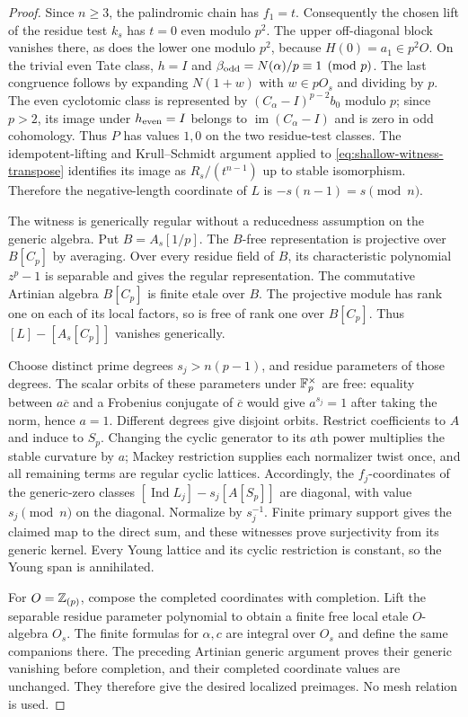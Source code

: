 \begin{proof}
Since $n\ge3$, the palindromic chain has $f_1=t$.
Consequently the chosen lift of the residue test $k_s$ has
$t=0$ even modulo $p^2$.
The upper off-diagonal block vanishes there, as does the
lower one modulo $p^2$, because $H(0)=a_1\in p^2O$.
On the trivial even Tate class, $h=I$ and
$\beta_{\rm odd}=N(\alpha)/p\equiv1\pmod p$.
The last congruence follows by expanding $N(1+w)$ with
$w\in pO_s$ and dividing by $p$.
The even cyclotomic class is represented by
$(C_\alpha-I)^{p-2}b_0$ modulo $p$; since $p>2$, its image
under $h_{\rm even}=I$ belongs to
$\operatorname{im}(C_\alpha-I)$ and is zero in odd cohomology.
Thus $P$ has values $1,0$ on the two residue-test classes.
The idempotent-lifting and Krull--Schmidt argument applied
to \eqref{eq:shallow-witness-transpose} identifies its image
as $R_s/(t^{n-1})$ up to stable isomorphism.
Therefore the negative-length coordinate of $L$ is
$-s(n-1)=s\pmod n$.

The witness is generically regular without a reducedness
assumption on the generic algebra.  Put $B=A_s[1/p]$.
The $B$-free representation is projective over $B[C_p]$
by averaging.  Over every residue field of $B$, its
characteristic polynomial $z^p-1$ is separable and gives
the regular representation.
The commutative Artinian algebra $B[C_p]$ is finite etale
over $B$.  The projective module has rank one on each
of its local factors, so is free of rank one over $B[C_p]$.
Thus $[L]-[A_s[C_p]]$ vanishes generically.

Choose distinct prime degrees $s_j>n(p-1)$, and residue
parameters of those degrees.  The scalar orbits of these
parameters under $\mathbb F_p^\times$ are free: equality between
$a\overline c$ and a Frobenius conjugate of $\overline c$
would give $a^{s_j}=1$ after taking the norm, hence $a=1$.
Different degrees give disjoint orbits.
Restrict coefficients to $A$ and induce to $S_p$.
Changing the cyclic generator to its $a$th power multiplies
the stable curvature by $a$; Mackey restriction supplies
each normalizer twist once, and all remaining terms are
regular cyclic lattices.
Accordingly, the $f_j$-coordinates of the generic-zero
classes $[\operatorname{Ind}L_j]-s_j[A[S_p]]$ are diagonal,
with value $s_j\pmod n$ on the diagonal.
Normalize by $s_j^{-1}$.  Finite primary support gives the
claimed map to the direct sum, and these witnesses prove
surjectivity from its generic kernel.
Every Young lattice and its cyclic restriction is constant,
so the Young span is annihilated.

For $O=\mathbb Z_{(p)}$, compose the completed coordinates with
completion.  Lift the separable residue parameter polynomial
to obtain a finite free local etale $O$-algebra $O_s$.
The finite formulas for $\alpha,c$ are integral over $O_s$
and define the same companions there.
The preceding Artinian generic argument proves their generic
vanishing before completion, and their completed coordinate
values are unchanged.  They therefore give the desired
localized preimages.  No mesh relation is used.
\end{proof}

